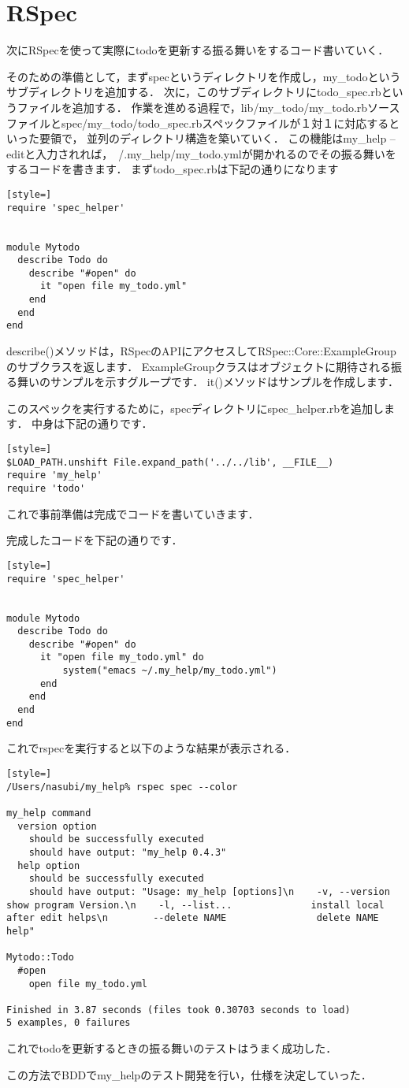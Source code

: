 \section{RSpec}
次にRSpecを使って実際にtodoを更新する振る舞いをするコード書いていく．

そのための準備として，まずspecというディレクトリを作成し，my\_todoというサブディレクトリを追加する．
次に，このサブディレクトリにtodo\_spec.rbというファイルを追加する．
作業を進める過程で，lib/my\_todo/my\_todo.rbソースファイルとspec/my\_todo/todo\_spec.rbスペックファイルが１対１に対応するといった要領で，
並列のディレクトリ構造を築いていく．
この機能はmy\_help --editと入力されれば，~/.my\_help/my\_todo.ymlが開かれるのでその振る舞いをするコードを書きます．
まずtodo\_spec.rbは下記の通りになります
\begin{lstlisting}[style=]
require 'spec_helper'


module Mytodo
  describe Todo do
    describe "#open" do
      it "open file my_todo.yml" 
    end
  end
end

\end{lstlisting}
describe()メソッドは，RSpecのAPIにアクセスしてRSpec::Core::ExampleGroupのサブクラスを返します．
ExampleGroupクラスはオブジェクトに期待される振る舞いのサンプルを示すグループです．
it()メソッドはサンプルを作成します．

このスペックを実行するために，specディレクトリにspec\_helper.rbを追加します．
中身は下記の通りです．
\begin{lstlisting}[style=]
$LOAD_PATH.unshift File.expand_path('../../lib', __FILE__)
require 'my_help'
require 'todo'
\end{lstlisting}
これで事前準備は完成でコードを書いていきます．

完成したコードを下記の通りです．
\begin{lstlisting}[style=]
require 'spec_helper'


module Mytodo
  describe Todo do
    describe "#open" do
      it "open file my_todo.yml" do
          system("emacs ~/.my_help/my_todo.yml")
      end
    end
  end
end

\end{lstlisting}
これでrspecを実行すると以下のような結果が表示される．
\begin{lstlisting}[style=]
/Users/nasubi/my_help% rspec spec --color

my_help command
  version option
    should be successfully executed
    should have output: "my_help 0.4.3"
  help option
    should be successfully executed
    should have output: "Usage: my_help [options]\n    -v, --version                    show program Version.\n    -l, --list...              install local after edit helps\n        --delete NAME                delete NAME help"

Mytodo::Todo
  #open
    open file my_todo.yml

Finished in 3.87 seconds (files took 0.30703 seconds to load)
5 examples, 0 failures

\end{lstlisting}
これでtodoを更新するときの振る舞いのテストはうまく成功した．

この方法でBDDでmy\_helpのテスト開発を行い，仕様を決定していった．

